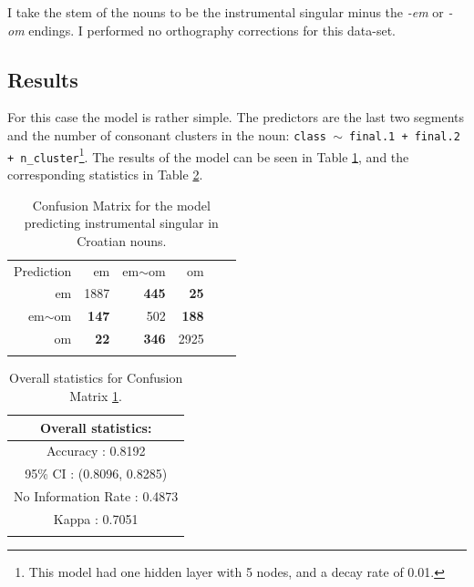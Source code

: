 I take the stem of the nouns to be the instrumental singular minus the \textit{-em} or \textit{-om} endings. I performed no orthography corrections for this data-set.

\subsection{Results}

For this case the model is rather simple. The predictors are the last two segments and the number of consonant clusters in the noun: \texttt{class $\sim$ final.1 + final.2 + n\_cluster}\footnote{This model had one hidden layer with 5 nodes, and a decay rate of 0.01.}. The results of the model can be seen in Table \ref{tab:ins-cro}, and the corresponding statistics in Table \ref{tab:ins-cro-stats}.

\begin{table}[!htpb]
  \centering
  \begin{tabular}{rrrrrr}
    \lsptoprule
    \multicolumn{4}{c}{Reference}                           \\
    \midrule
    Prediction & em           & em$\sim$om   & om           \\
    em         & 1887         & \textbf{445} & \textbf{25}  \\
    em$\sim$om & \textbf{147} & 502          & \textbf{188} \\
    om         & \textbf{22}  & \textbf{346} & 2925         \\
    \lspbottomrule
  \end{tabular}
  \caption{Confusion Matrix for the model predicting instrumental singular in Croatian nouns.}\label{tab:ins-cro}
\end{table}

\begin{table}[!htpb]
  \centering
  \begin{tabular}{c}
    \lsptoprule
    Overall statistics:          \\
    \midrule
    Accuracy : 0.8192            \\
    95\% CI : (0.8096, 0.8285)   \\
    No Information Rate : 0.4873 \\
    Kappa : 0.7051               \\
    \lspbottomrule
  \end{tabular}
  \caption{Overall statistics for Confusion Matrix \ref{tab:ins-cro}.}\label{tab:ins-cro-stats}
\end{table}

